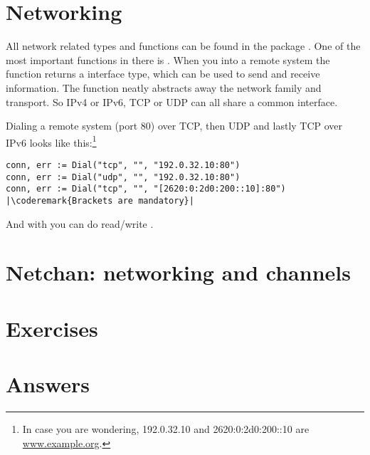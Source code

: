 \section{Networking}
All network related types and functions can be found in the package . One of the
most important functions in there is . When you 
into a remote system the function returns a  interface type, which can be used
to send and receive information. The function  neatly abstracts away the network
family and transport. So IPv4 or IPv6, TCP or UDP can all share a common interface. 

Dialing a remote system (port 80) over TCP, then UDP and lastly TCP over IPv6 looks
like this:\footnote{In case
you are wondering, 192.0.32.10 and 2620:0:2d0:200::10 are \url{www.example.org}.}
\begin{lstlisting}
conn, err := Dial("tcp", "", "192.0.32.10:80")
conn, err := Dial("udp", "", "192.0.32.10:80")
conn, err := Dial("tcp", "", "[2620:0:2d0:200::10]:80") |\coderemark{Brackets are mandatory}|
\end{lstlisting}

And with  you can do read/write .


\section{Netchan: networking and channels}


\section{Exercises}










\cleardoublepage
\section{Answers}
\shipoutAnswer
